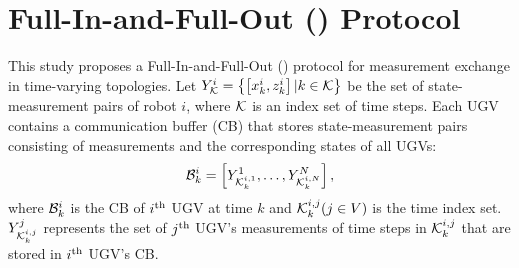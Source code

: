 \section{Full-In-and-Full-Out (\proto) Protocol}\label{sec:\proto}
	This study proposes a Full-In-and-Full-Out (\proto) protocol for measurement exchange in time-varying topologies.
	Let $Y^i_{\mathcal{K}}=\left\lbrace \left[x^i_k,z^i_k\right]|k\in \mathcal{K}\right\rbrace$ 
	be the set of state-measurement pairs of robot $i$, where $\mathcal{K}$ is an index set of time steps.
	Each UGV contains a communication buffer (CB) that stores state-measurement pairs consisting of measurements and the corresponding states of all UGVs:
	\begin{equation*}		
		\mathcal{B}^i_k=\left[ Y^1_{\mathcal{K}^{i,1}_k},\dots,Y^N_{\mathcal{K}^{i,N}_k}\right],
	\end{equation*}
	where $\mathcal{B}^i_k$ is the CB of $i^\text{th}$ UGV at time $k$ and $\mathcal{K}^{i,j}_k (j\in V)$ is the time index set.
	$Y^j_{\mathcal{K}^{i,j}_k}$ represents the set of $j^\text{th}$ UGV's measurements of time steps in $\mathcal{K}^{i,j}_k$ that are stored in $i^\text{th}$ UGV's CB.
